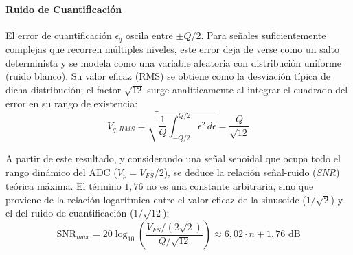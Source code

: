 \begin{marginfigure}
    \centering
    \shorthandoff{>}
    \caption[Función de transferencia de un ADC.]{Función de transferencia ideal de un cuantificador. La característica de \emph{escalera} de cuantificación muestra cómo múltiples valores de entrada mapean al mismo código digital, originando el error de cuantificación.}\label{fig:escalera_cuant}
\end{marginfigure}

\paragraph{Ruido de Cuantificación}
El error de cuantificación $\epsilon_q$ oscila entre $\pm Q/2$. Para señales suficientemente complejas que recorren múltiples niveles, este error deja de verse como un salto determinista y se modela como una variable aleatoria con distribución uniforme (ruido blanco). Su valor eficaz (RMS) se obtiene como la desviación típica de dicha distribución; el factor $\sqrt{12}$ surge analíticamente al integrar el cuadrado del error en su rango de existencia:
\begin{equation}
    V_{q,RMS} = \sqrt{\frac{1}{Q} \int_{-Q/2}^{Q/2} \epsilon^2 \, d\epsilon} = \frac{Q}{\sqrt{12}}
\end{equation}

A partir de este resultado, y considerando una señal senoidal que ocupa todo el rango dinámico del ADC ($V_{p} = V_{FS}/2$), se deduce la relación señal-ruido (\textit{SNR}) teórica máxima. El término $1{,}76$ no es una constante arbitraria, sino que proviene de la relación logarítmica entre el valor eficaz de la sinusoide ($1/\sqrt{2}$) y el del ruido de cuantificación ($1/\sqrt{12}$):
\begin{equation}
    \text{SNR}_{max} = 20 \log_{10} \left( \frac{V_{FS}/(2\sqrt{2})}{Q/\sqrt{12}} \right) \approx 6,02 \cdot n + 1,76 \text{ dB}
\end{equation}


